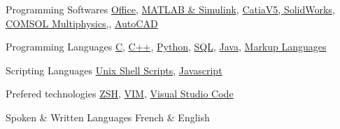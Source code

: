 

\begin{cvskills}

  \cvskill
    {Programming Softwares} %
    {\href{https://www.office.com/}{Office},
     \href{https://www.mathworks.com/}{MATLAB \& Simulink},
     \href{https://www.3ds.com/products-services/}{CatiaV5, SolidWorks},
     \href{https://www.comsol.com/}{COMSOL Multiphysics,},
     \href{https://www.autodesk.ca/en/products/autocad/overview}{AutoCAD}
    } %

  \cvskill
    {Programming Languages} %
    {\href{https://en.cppreference.com/w/c/languagehttps://en.cppreference.com/w/c/language}{C},
     \href{https://en.cppreference.com/w/cpp/language}{C++},
     \href{https://www.python.org/}{Python},
     \href{https://docs.oracle.com/en/database/other-databases/index.html}{SQL},
     \href{https://docs.oracle.com/en/java/index.html}{Java},
     \href{https://techterms.com/definition/markup_language}{Markup Languages}
    } %

  \cvskill
    {Scripting Languages} %
    {\href{https://www.gnu.org/software/bash/}{Unix Shell Scripts},
     \href{https://developer.oracle.com/ca-en/javascript/}{Javascript}
    }

  \cvskill
    {Prefered technologies} %
    {\href{http://zsh.sourceforge.net/}{ZSH},
     \href{https://www.vim.org/}{VIM},
     \href{https://code.visualstudio.com/}{Visual Studio Code}
    } %

  \cvskill
  {Spoken \& Written Languages} %
  {French \& English} %

\end{cvskills}
